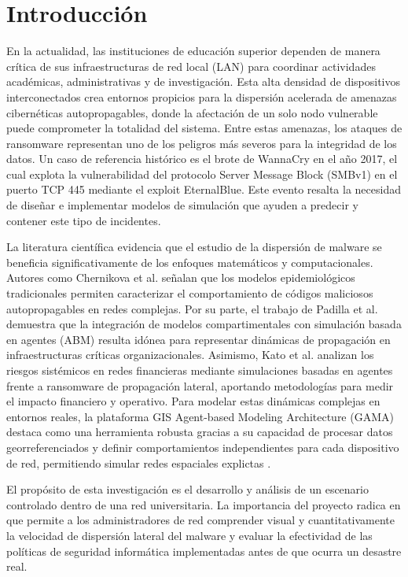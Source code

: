 \section{Introducción}

En la actualidad, las instituciones de educación superior dependen de manera crítica de sus infraestructuras de red local (LAN) para coordinar actividades académicas, administrativas y de investigación. Esta alta densidad de dispositivos interconectados crea entornos propicios para la dispersión acelerada de amenazas cibernéticas autopropagables, donde la afectación de un solo nodo vulnerable puede comprometer la totalidad del sistema. Entre estas amenazas, los ataques de ransomware representan uno de los peligros más severos para la integridad de los datos. Un caso de referencia histórico es el brote de WannaCry en el año 2017, el cual explota la vulnerabilidad del protocolo Server Message Block (SMBv1) en el puerto TCP 445 mediante el exploit EternalBlue. Este evento resalta la necesidad de diseñar e implementar modelos de simulación que ayuden a predecir y contener este tipo de incidentes.

La literatura científica evidencia que el estudio de la dispersión de malware se beneficia significativamente de los enfoques matemáticos y computacionales. Autores como Chernikova et al. \cite{chernikova2023modeling} señalan que los modelos epidemiológicos tradicionales permiten caracterizar el comportamiento de códigos maliciosos autopropagables en redes complejas. Por su parte, el trabajo de Padilla et al. \cite{padilla2025serdux} demuestra que la integración de modelos compartimentales con simulación basada en agentes (ABM) resulta idónea para representar dinámicas de propagación en infraestructuras críticas organizacionales. Asimismo, Kato et al. \cite{kato2025agent} analizan los riesgos sistémicos en redes financieras mediante simulaciones basadas en agentes frente a ransomware de propagación lateral, aportando metodologías para medir el impacto financiero y operativo. Para modelar estas dinámicas complejas en entornos reales, la plataforma GIS Agent-based Modeling Architecture (GAMA) destaca como una herramienta robusta gracias a su capacidad de procesar datos georreferenciados y definir comportamientos independientes para cada dispositivo de red, permitiendo simular redes espaciales explictas \cite{math2024paradigm, ieee2025optimal}.

El propósito de esta investigación es el desarrollo y análisis de un escenario controlado dentro de una red universitaria. La importancia del proyecto radica en que permite a los administradores de red comprender visual y cuantitativamente la velocidad de dispersión lateral del malware y evaluar la efectividad de las políticas de seguridad informática implementadas antes de que ocurra un desastre real.

